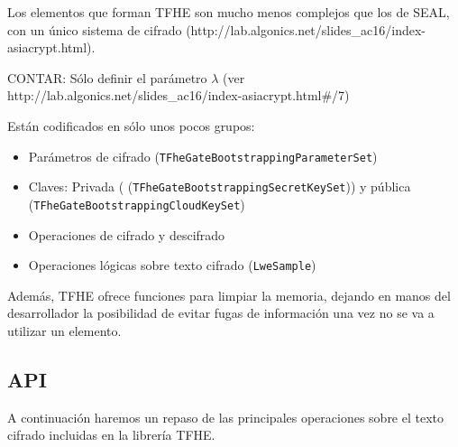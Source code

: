 Los elementos que forman TFHE son mucho menos complejos que los de SEAL, con un único sistema de cifrado (http://lab.algonics.net/slides_ac16/index-asiacrypt.html).

CONTAR: Sólo definir el parámetro $\lambda$ (ver http://lab.algonics.net/slides_ac16/index-asiacrypt.html#/7)

Están codificados en sólo unos pocos grupos:

\begin{itemize}
  \item Parámetros de cifrado (\texttt{TFheGateBootstrappingParameterSet})
  \item Claves: Privada ( (\texttt{TFheGateBootstrappingSecretKeySet})) y pública (\texttt{TFheGateBootstrappingCloudKeySet})
  \item Operaciones de cifrado y descifrado
  \item Operaciones lógicas sobre texto cifrado (\texttt{LweSample})
\end{itemize}

Además, TFHE ofrece funciones para limpiar la memoria, dejando en manos del desarrollador la posibilidad de evitar fugas de información una vez no se va a utilizar un elemento.

\subsection{API}

A continuación haremos un repaso de las principales operaciones sobre el texto cifrado incluidas en la librería TFHE.

